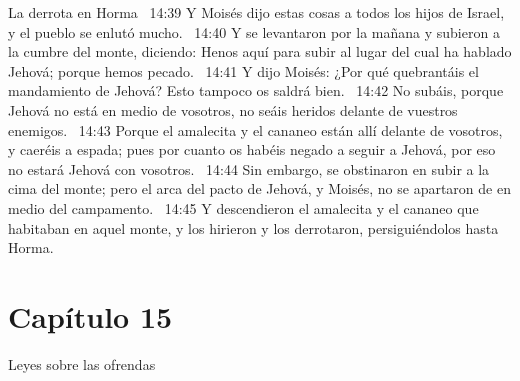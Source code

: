 La derrota en Horma   
14:39 Y Moisés dijo estas cosas a todos los hijos de Israel, y el pueblo se enlutó mucho.  
14:40 Y se levantaron por la mañana y subieron a la cumbre del monte, diciendo: Henos aquí para subir al lugar del cual ha hablado Jehová; porque hemos pecado.  
14:41 Y dijo Moisés: ¿Por qué quebrantáis el mandamiento de Jehová? Esto tampoco os saldrá bien.  
14:42 No subáis, porque Jehová no está en medio de vosotros, no seáis heridos delante de vuestros enemigos.  
14:43 Porque el amalecita y el cananeo están allí delante de vosotros, y caeréis a espada; pues por cuanto os habéis negado a seguir a Jehová, por eso no estará Jehová con vosotros.  
14:44 Sin embargo, se obstinaron en subir a la cima del monte; pero el arca del pacto de Jehová, y Moisés, no se apartaron de en medio del campamento.  
14:45 Y descendieron el amalecita y el cananeo que habitaban en aquel monte, y los hirieron y los derrotaron, persiguiéndolos hasta Horma.  
\section*{Capítulo 15 }
Leyes sobre las ofrendas  


